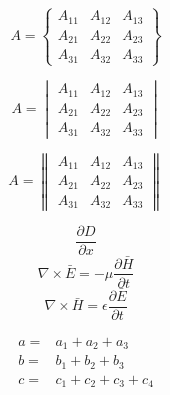 \documentclass[12pt,a4paper,twoside]{report}
\begin{document}
\begin{equation}
A =
\begin{Bmatrix}
A_{11} & A_{12} & A_{13} \\
A_{21} & A_{22} & A_{23} \\
A_{31} & A_{32} & A_{33}
\end{Bmatrix}
\end{equation}

\begin{equation}
A =
\begin{vmatrix}
A_{11} & A_{12} & A_{13} \\
A_{21} & A_{22} & A_{23} \\
A_{31} & A_{32} & A_{33}
\end{vmatrix}
\end{equation}

\begin{equation}
A =
\begin{Vmatrix}
A_{11} & A_{12} & A_{13} \\
A_{21} & A_{22} & A_{23} \\
A_{31} & A_{32} & A_{33}
\end{Vmatrix}
\end{equation}

\begin{equation}
\frac{\partial D}{\partial x}
\end{equation}
\begin{equation}
\nabla \times \bar{E} = - \mu \frac{\partial \bar{H}}{\partial t}
\end{equation}
\begin{equation}
\nabla \times \bar{H} =  \epsilon \frac{\partial \bar{E}}{\partial t}
\end{equation}

\begin{align}
 a = & a_1 + a_2 + a_3 \\
 b = & b_1 + b_2 + b_3 \\
 c = & c_1 + c_2 + c_3 + c_4
\end{align}
\end{document}

